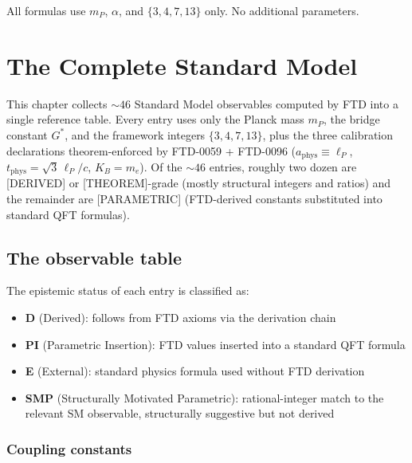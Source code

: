\documentclass[
  11pt,
  letterpaper,
  twoside,
  openany]{book}
\makeatletter
\providecommand{\tightlist}{%
  \setlength{\itemsep}{0pt}\setlength{\parskip}{0pt}}
\let\orig@section\section
\renewcommand{\section}{\needspace{8\baselineskip}\orig@section}
\let\orig@subsection\subsection
\renewcommand{\subsection}{\needspace{6\baselineskip}\orig@subsection}
\newcommand{\Gs}{G^{*}{}}
\makeatother
\begin{document}
All formulas use \(m_P\), \(\alpha\), and \(\{3, 4, 7, 13\}\) only. No
additional parameters.

\chapter{The Complete Standard Model}\label{sec-sm}

This chapter collects \(\sim 46\) Standard Model observables computed by
FTD into a single reference table. Every entry uses only the Planck mass
\(m_P\), the bridge constant \(\Gs\), and the framework integers
\(\{3, 4, 7, 13\}\), plus the three calibration declarations
theorem-enforced by FTD-0059 + FTD-0096
(\(a_\mathrm{phys} \equiv \ell_P\),
\(t_\mathrm{phys} = \sqrt{3}\,\ell_P/c\), \(K_B = m_e\)). Of the
\(\sim 46\) entries, roughly two dozen are {[}DERIVED{]} or
{[}THEOREM{]}-grade (mostly structural integers and ratios) and the
remainder are {[}PARAMETRIC{]} (FTD-derived constants substituted into
standard QFT formulas).

\section{The observable table}\label{the-observable-table}

The epistemic status of each entry is classified as:

\begin{itemize}
\tightlist
\item
  \textbf{D} (Derived): follows from FTD axioms via the derivation chain
\item
  \textbf{PI} (Parametric Insertion): FTD values inserted into a
  standard QFT formula
\item
  \textbf{E} (External): standard physics formula used without FTD
  derivation
\item
  \textbf{SMP} (Structurally Motivated Parametric): rational-integer
  match to the relevant SM observable, structurally suggestive but not
  derived
\end{itemize}

\subsection{Coupling constants}\label{coupling-constants}
\end{document}
